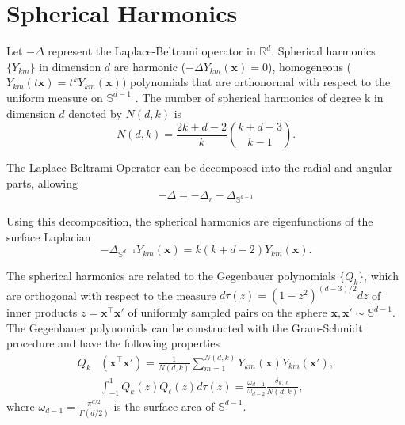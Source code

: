 \documentclass{article}
\begin{document}
\section{Spherical Harmonics}\label{SISphericalHarmonics}

Let $-\Delta$ represent the Laplace-Beltrami operator in $\mathbb{R}^d$. Spherical harmonics $\{Y_{km}\}$ in dimension $d$ are harmonic ($-\Delta Y_{km}(\mathbf{x}) = 0$), homogeneous ($Y_{km}(t\mathbf{x}) = t^{k} Y_{km}(\mathbf{x})$) polynomials that are orthonormal with respect to the uniform measure on $\mathbb{S}^{d-1}$ \cite{costasspherical,Dai_2013}. The number of spherical harmonics of degree k in dimension $d$ denoted by $N(d,k)$ is
\begin{equation}\label{eq:degens}
 N(d,k) = \frac{2k+d-2}{k}\binom{k+d-3}{k-1}.
\end{equation}

The Laplace Beltrami Operator can be decomposed into the radial and angular parts, allowing
\begin{equation}
    -\Delta = - \Delta_r - \Delta_{\mathbb{S}^{d-1}}
\end{equation}

Using this decomposition, the spherical harmonics are eigenfunctions of the surface Laplacian
\begin{equation}
    -\Delta_{\mathbb{S}^{d-1}} Y_{km}(\mathbf{x}) = k(k+d-2)Y_{km}(\mathbf{x}).
\end{equation}

The spherical harmonics are related to the Gegenbauer polynomials $\{Q_k\}$, which are orthogonal with respect to the measure $d\tau(z) = (1-z^2)^{(d-3)/2} dz$ of inner products $z = \mathbf{x}^\top \mathbf{x}'$ of uniformly sampled pairs on the sphere $\mathbf{x}, \mathbf{x}' \sim \mathbb{S}^{d-1}$. The Gegenbauer polynomials can be constructed with the Gram-Schmidt procedure and have the following properties 
\begin{align}
    Q_k&(\mathbf{x}^\top \mathbf{x}') = \frac{1}{N(d,k)} \sum_{m=1}^{N(d,k)} Y_{km}(\mathbf{x}) Y_{km}(\mathbf{x}'), \nonumber 
    \\
    &\int_{-1}^1 Q_{k}(z) Q_{\ell}(z) d\tau(z) = \frac{\omega_{d-1}}{\omega_{d-2}} \frac{\delta_{k,\ell}}{N(d,k)},
\end{align}
%
where $\omega_{d-1} = \frac{\pi^{d/2}}{\Gamma(d/2)}$ is the surface area of $\mathbb{S}^{d-1}$.

\end{document}
